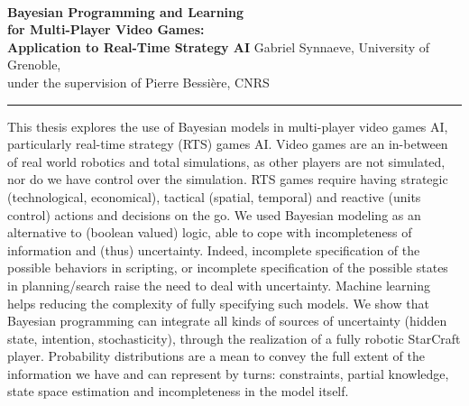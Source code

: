 \documentclass[a4paper,12pt]{article}
\date{}
\begin{document}
\begin{flushright}
\quad
\vskip 4pt
{\fontsize{16pt}{16} \selectfont \textbf{\\
Bayesian Programming and Learning\\
for Multi-Player Video Games: \\
Application to Real-Time Strategy AI}}
\vskip 10pt
Gabriel Synnaeve, University of Grenoble, \\
under the supervision of Pierre Bessi\`{e}re, CNRS
\vskip 10pt
\hrule height 4pt
\vskip 4pt
\end{flushright}

\thispagestyle{empty}

This thesis explores the use of Bayesian models in multi-player video games AI, particularly real-time strategy (RTS) games AI. Video games are an in-between of real world robotics and total simulations, as other players are not simulated, nor do we have control over the simulation. RTS games require having strategic (technological, economical), tactical (spatial, temporal) and reactive (units control) actions and decisions on the go. %
We used Bayesian modeling as an alternative to (boolean valued) logic, able to cope with incompleteness of information and (thus) uncertainty. %
Indeed, incomplete specification of the possible behaviors in scripting, or incomplete specification of the possible states in planning/search raise the need to deal with uncertainty. Machine learning helps reducing the complexity of fully specifying such models. 
We show that Bayesian programming can integrate all kinds of sources of uncertainty (hidden state, intention, stochasticity), through the realization of a fully robotic StarCraft player. Probability distributions are a mean to convey the full extent of the information we have %
and can represent by turns: constraints, partial knowledge, state space estimation and incompleteness in the model itself.
\end{document}
